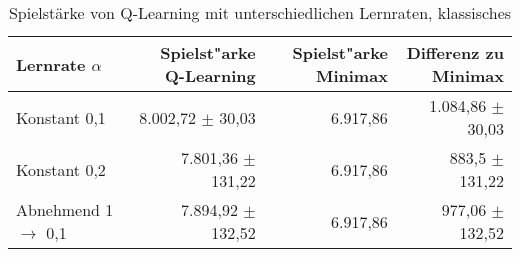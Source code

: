 \begin{table}
\centering
\caption[Spielstärke Q-Learning unterschiedliche Lernraten, klassisches \splay]{Spielstärke von Q-Learning mit unterschiedlichen Lernraten, klassisches \splay}
\label{tab:playingAbility_ql_normal}

\begin{tabular}{lrrr}
\toprule
Lernrate $\alpha$ &  Spielst"arke Q-Learning & Spielst"arke Minimax & Differenz zu Minimax \\ \midrule
Konstant 0,1                    & 8.002,72 $\pm$ \phantom{0}30,03   & 6.917,86  & 1.084,86 $\pm$ \phantom{0}30,03 \\
Konstant 0,2                    & 7.801,36 $\pm$ 131,22             & 6.917,86  & 883,5 $\pm$ 131,22 \\
Abnehmend 1 $\rightarrow$ 0,1   & 7.894,92 $\pm$ 132,52             & 6.917,86  & 977,06 $\pm$ 132,52 \\ \bottomrule

\end{tabular}

\end{table}